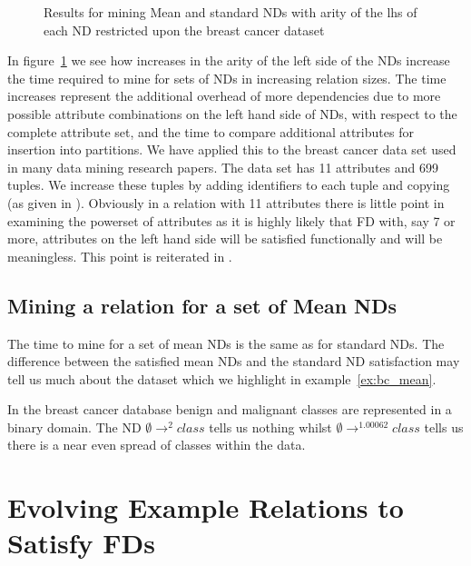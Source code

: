 \begin{figure}
\centerline{}
\caption{\label{graph:nd_mine1}{Results for mining Mean and
standard NDs with arity of the lhs of each ND restricted upon the
breast cancer dataset}}
\end{figure}

In figure~\ref{graph:nd_mine1} we see how increases in the arity of
the left side of the NDs increase the time required to mine for sets
of NDs in increasing relation sizes. The time increases represent the
additional overhead of more dependencies due to more possible
attribute combinations on the left hand side of NDs, with respect to
the complete attribute set, and the time to compare additional
attributes for insertion into partitions. We have applied this to the
breast cancer data set \cite{bkm98} used in many data mining research
papers. The data set has 11 attributes and 699 tuples. We increase
these tuples by adding identifiers to each tuple and copying (as
given in \cite{hkp98}). Obviously in a relation with 11 attributes
there is little point in examining the powerset of attributes as it is
highly likely that FD with, say 7 or more, attributes on the left hand
side will be satisfied functionally and will be meaningless. This
point is reiterated in \cite{sf93}. 

\subsection{Mining a relation for a set of Mean NDs}

The time to mine for a set of mean NDs is the same as for standard
NDs. The difference between the satisfied mean NDs and the standard ND
satisfaction may tell us much about the dataset which we highlight in
example~\ref{ex:bc_mean}.

 
\begin{example}\label{ex:bc_mean}
\begin{rm}
In the breast cancer database benign and malignant classes are
represented in a binary domain. The ND $\emptyset \to^2 class$ tells
us nothing whilst $\emptyset \to^{1.00062} class$ tells us there is a
near even spread of classes within the data. 
\end{rm}
\end{example}


\section{Evolving Example Relations to Satisfy FDs}\label{sec:nd_evolve}

